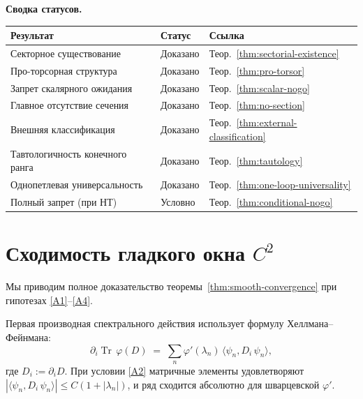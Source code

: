 \documentclass[12pt,a4paper]{article}
\theoremstyle{plain}
\theoremstyle{definition}
\theoremstyle{remark}
\newcommand{\Tr}{\operatorname{Tr}}
\begin{document}
\medskip

\noindent\textbf{Сводка статусов.}
\begin{center}
\begin{tabular}{lll}
\toprule
\textbf{Результат} & \textbf{Статус} & \textbf{Ссылка} \\
\midrule
Секторное существование & Доказано & Теор.~\ref{thm:sectorial-existence} \\
Про-торсорная структура & Доказано & Теор.~\ref{thm:pro-torsor} \\
Запрет скалярного ожидания & Доказано & Теор.~\ref{thm:scalar-nogo} \\
Главное отсутствие сечения & Доказано & Теор.~\ref{thm:no-section} \\
Внешняя классификация & Доказано & Теор.~\ref{thm:external-classification} \\
Тавтологичность конечного ранга & Доказано & Теор.~\ref{thm:tautology} \\
Однопетлевая универсальность & Доказано & Теор.~\ref{thm:one-loop-universality} \\
Полный запрет (при НТ) & Условно & Теор.~\ref{thm:conditional-nogo} \\
\bottomrule
\end{tabular}
\end{center}


\appendix

\section{Сходимость гладкого окна \texorpdfstring{$C^2$}{C2}}
\label{app:convergence}

Мы приводим полное доказательство теоремы~\ref{thm:smooth-convergence}
при гипотезах \ref{A1}--\ref{A4}.

Первая производная спектрального действия использует формулу
Хеллмана--Фейнмана:
\begin{equation}
  \partial_i \Tr\,\varphi(D) \;=\;
  \sum_n \varphi'(\lambda_n)\,\langle\psi_n, D_i\,\psi_n\rangle,
\end{equation}
где $D_i := \partial_i D$.  При условии \ref{A2} матричные элементы
удовлетворяют $|\langle\psi_n, D_i\,\psi_n\rangle| \le C(1+|\lambda_n|)$,
и ряд сходится абсолютно для шварцевской $\varphi'$.
\end{document}
